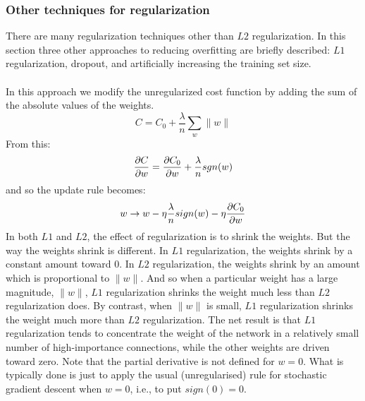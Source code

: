 \subsubsection{Other techniques for regularization}
There are many regularization techniques other than $L2$ regularization. In this section three other approaches to reducing overfitting are briefly described: $L1$ regularization, dropout, and artificially increasing the training set size. 

\paragraph{}In this approach we modify the unregularized cost function by adding the sum of the absolute values of the weights.
\begin{equation}
C =C_0 + \frac{\lambda}{n}\sum_w \|w\|
\end{equation}
From this:
\begin{equation}
\begin{aligned}
\frac{\mathrm{\partial} C}{\mathrm{\partial} w} = \frac{\mathrm{\partial} C_0}{\mathrm{\partial} w} + \frac{\lambda}{n} sgn(w) 
\end{aligned}
\end{equation}
and so the update rule becomes:
\begin{equation}
w\rightarrow w-\eta \frac{\lambda}{n} sign(w) -\eta \frac{\mathrm{\partial} C_0}{\mathrm{\partial} w} 
\end{equation}
In both $L1$ and $L2$, the effect of regularization is to shrink the weights. But the way the weights shrink is different. In $L1$ regularization, the weights shrink by a constant amount toward $0$. In $L2$ regularization, the weights shrink by an amount which is proportional to $\|w\|$. And so when a particular weight has a large magnitude, $\|w\|$, $L1$ regularization shrinks the weight much less than $L2$ regularization does. By contrast, when $\|w\|$ is small, $L1$ regularization shrinks the weight much more than $L2$ regularization. The net result is that $L1$ regularization tends to concentrate the weight of the network in a relatively small number of high-importance connections, while the other weights are driven toward zero. Note that the partial derivative is not defined for $w=0$. What is typically done is just to apply the usual (unregularised) rule for stochastic gradient descent when $w=0$, i.e., to put $sign(0)=0$.

